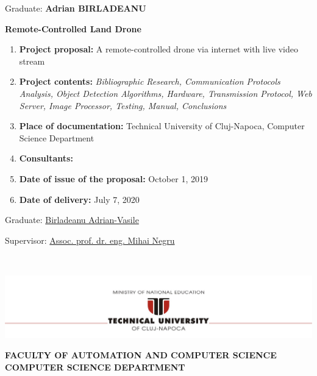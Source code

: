 \documentclass[12pt,a4paper,twoside]{report}
\renewcommand{\thesisauthor}{Adrian BIRLADEANU}    %
\renewcommand{\thesistitle}{Remote-Controlled Land Drone}
\newcommand{\department}{\bf FACULTY OF AUTOMATION AND COMPUTER SCIENCE\\
COMPUTER SCIENCE DEPARTMENT}
\newcommand{\utcnlogo}{\includegraphics[width=15cm]{img/tucn.jpg}}
\begin{document}
\vspace{2cm}

\begin{center}
Graduate: {\bf \thesisauthor}

\vspace{1cm}

{\bf \thesistitle}
\end{center}

\vspace{1cm}

\begin{enumerate}
 \item {\bf Project proposal:} A remote-controlled drone via internet with live video stream
\item {\bf Project contents:} \textit{Bibliographic Research, Communication Protocols Analysis, Object Detection Algorithms, Hardware, Transmission Protocol, Web Server, Image Processor, Testing, Manual, Conclusions}
\item {\bf Place of documentation:} Technical University of Cluj-Napoca, Computer Science Department
\item {\bf Consultants:}
\item {\bf Date of issue of the proposal:} October 1, 2019
\item {\bf Date of  delivery:} July 7, 2020
  \end{enumerate}
\vspace{1.2cm}

\hspace{6cm} Graduate: \underline{Birladeanu Adrian-Vasile} 

\vspace{0.5cm}
\hspace{6cm} Supervisor: \underline{Assoc. prof. dr. eng. Mihai Negru}

\thispagestyle{empty}


\newpage
$ $


\thispagestyle{empty}

\begin{center}
\utcnlogo

\department
\end{center}

\vspace{0.5cm}


\end{document}
